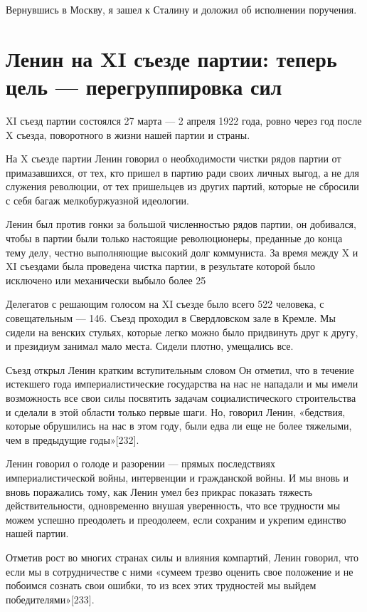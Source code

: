 \documentclass[12pt, a4paper, openany]{book}
\begin{document}
Вернувшись в Москву, я зашел к Сталину и доложил об исполнении поручения.

\newpage
\section[Ленин на XI съезде партии: теперь цель — перегруппировка сил]{\center \textbf{Ленин на XI съезде партии: теперь цель — перегруппировка сил}}


XI съезд партии состоялся 27 марта — 2 апреля 1922 года, ровно через год после X съезда, поворотного в жизни нашей партии и страны.

На X съезде партии Ленин говорил о необходимости чистки рядов партии от примазавшихся, от тех, кто пришел в партию ради своих личных выгод, а не для служения революции, от тех пришельцев из других партий, которые не сбросили с себя багаж мелкобуржуазной идеологии.

Ленин был против гонки за большой численностью рядов партии, он добивался, чтобы в партии были только настоящие революционеры, преданные до конца тему делу, честно выполняющие высокий долг коммуниста. За время между X и XI съездами была проведена чистка партии, в результате которой было исключено или механически выбыло более 25 %

Делегатов с решающим голосом на XI съезде было всего 522 человека, с совещательным — 146. Съезд проходил в Свердловском зале в Кремле. Мы сидели на венских стульях, которые легко можно было придвинуть друг к другу, и президиум занимал мало места. Сидели плотно, умещались все.

Съезд открыл Ленин кратким вступительным словом Он отметил, что в течение истекшего года империалистические государства на нас не нападали и мы имели возможность все свои силы посвятить задачам социалистического строительства и сделали в этой области только первые шаги. Но, говорил Ленин, «бедствия, которые обрушились на нас в этом году, были едва ли еще не более тяжелыми, чем в предыдущие годы»[232].

Ленин говорил о голоде и разорении — прямых последствиях империалистической войны, интервенции и гражданской войны. И мы вновь и вновь поражались тому, как Ленин умел без прикрас показать тяжесть действительности, одновременно внушая уверенность, что все трудности мы можем успешно преодолеть и преодолеем, если сохраним и укрепим единство нашей партии.

Отметив рост во многих странах силы и влияния компартий, Ленин говорил, что если мы в сотрудничестве с ними «сумеем трезво оценить свое положение и не побоимся сознать свои ошибки, то из всех этих трудностей мы выйдем победителями»[233].
\end{document}
